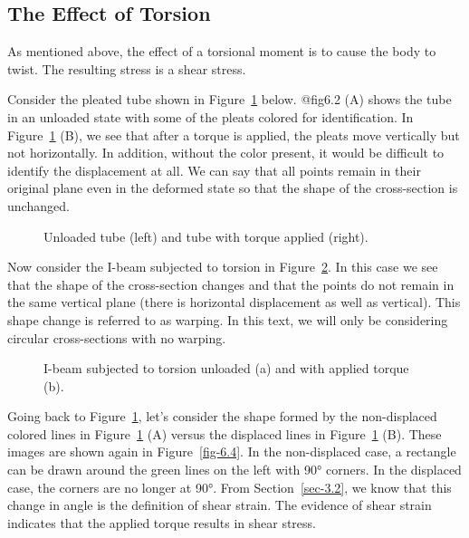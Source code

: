 \documentclass[
  letterpaper,
  DIV=11,
  numbers=noendperiod]{scrreprt}
\theoremstyle{definition}
\theoremstyle{remark}
\begin{document}
\subsection{The Effect of Torsion}\label{the-effect-of-torsion}

As mentioned above, the effect of a torsional moment is to cause the
body to twist. The resulting stress is a shear stress.

Consider the pleated tube shown in Figure~\ref{fig-6.2} below. @fig6.2
(A) shows the tube in an unloaded state with some of the pleats colored
for identification. In Figure~\ref{fig-6.2} (B), we see that after a
torque is applied, the pleats move vertically but not horizontally. In
addition, without the color present, it would be difficult to identify
the displacement at all. We can say that all points remain in their
original plane even in the deformed state so that the shape of the
cross-section is unchanged.

\begin{figure}


\caption{\label{fig-6.2}Unloaded tube (left) and tube with torque
applied (right).}

\end{figure}%

Now consider the I-beam subjected to torsion in Figure~\ref{fig-6.3}. In
this case we see that the shape of the cross-section changes and that
the points do not remain in the same vertical plane (there is horizontal
displacement as well as vertical). This shape change is referred to as
warping. In this text, we will only be considering circular
cross-sections with no warping.

\begin{figure}


\caption{\label{fig-6.3}I-beam subjected to torsion unloaded (a) and
with applied torque (b).}

\end{figure}%

Going back to Figure~\ref{fig-6.2}, let's consider the shape formed by
the non-displaced colored lines in Figure~\ref{fig-6.2} (A) versus the
displaced lines in Figure~\ref{fig-6.2} (B). These images are shown
again in Figure~\ref{fig-6.4}. In the non-displaced case, a rectangle
can be drawn around the green lines on the left with 90° corners. In the
displaced case, the corners are no longer at 90°. From
Section~\ref{sec-3.2}, we know that this change in angle is the
definition of shear strain. The evidence of shear strain indicates that
the applied torque results in shear stress.
\end{document}
